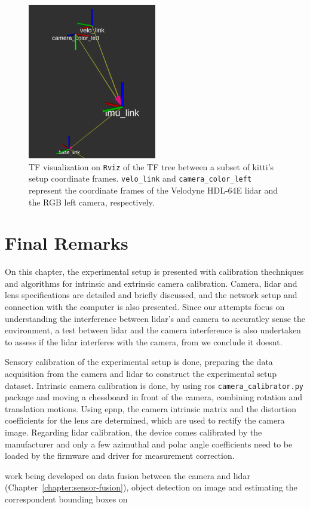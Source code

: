 \begin{figure}[H]
	\centering
	\includegraphics[width=0.5\textwidth]{img/KITTI/tf.png}
	\caption{TF visualization on \texttt{Rviz} of the TF tree between a subset of \ac{kitti}'s setup coordinate frames. \texttt{velo\_link} and \texttt{camera\_color\_left} represent the coordinate frames of the Velodyne HDL-64E \ac{lidar} and the RGB left camera, respectively.}
	\label{fig:kitti-tf-frames}
\end{figure}

\section{Final Remarks}
\label{sec:calibration:final-remarks}

On this chapter, the experimental setup is presented with calibration thechniques and algorithms for intrinsic and extrinsic camera calibration. Camera, \ac{lidar} and lens specifications are detailed and briefly discussed, and the network setup and connection with the computer is also presented. Since our attempts focus on understanding the interference between \ac{lidar}'s and camera to accuratley sense the environment, a test between \ac{lidar} and the camera interference is also undertaken to assess if the \ac{lidar} interferes with the camera, from we conclude it doesnt.

Sensory calibration of the experimental setup is done, preparing the data acquisition from the camera and \ac{lidar} to construct the experimental setup dataset. Intrinsic camera calibration is done, by using \ac{ros} \texttt{camera\_calibrator.py} package and moving a chessboard in front of the camera, combining rotation and translation motions. Using \acl{epnp}, the camera intrinsic matrix and the distortion coefficients for the lens are determined, which are used to rectify the camera image. Regarding \ac{lidar} calibration, the device comes calibrated by the manufacturer and only a few azimuthal and polar angle coefficients need to be loaded by the firmware and driver for measurement correction.

work being developed on data fusion between the camera and \ac{lidar} (Chapter~\ref{chapter:sensor-fusion}), object detection on image and estimating the correspondent bounding boxes on 
